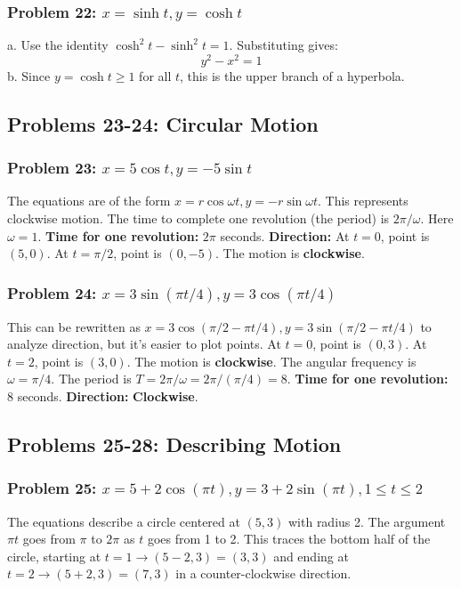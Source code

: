 \documentclass{article}
\begin{document}
\subsubsection{Problem 22: \(x=\sinh t, y=\cosh t\)}
a. Use the identity \(\cosh^2 t - \sinh^2 t = 1\). Substituting gives:
\[y^2 - x^2 = 1\]
b. Since \(y=\cosh t \ge 1\) for all \(t\), this is the upper branch of a hyperbola.

\subsection{Problems 23-24: Circular Motion}

\subsubsection{Problem 23: \(x=5\cos t, y=-5\sin t\)}
The equations are of the form \(x=r\cos\omega t, y=-r\sin\omega t\). This represents clockwise motion. The time to complete one revolution (the period) is \(2\pi/\omega\). Here \(\omega=1\).
\textbf{Time for one revolution:} \(2\pi\) seconds.
\textbf{Direction:} At \(t=0\), point is \((5,0)\). At \(t=\pi/2\), point is \((0,-5)\). The motion is \textbf{clockwise}.

\subsubsection{Problem 24: \(x=3\sin(\pi t/4), y=3\cos(\pi t/4)\)}
This can be rewritten as \(x=3\cos(\pi/2 - \pi t/4), y=3\sin(\pi/2 - \pi t/4)\) to analyze direction, but it's easier to plot points. At \(t=0\), point is \((0,3)\). At \(t=2\), point is \((3,0)\). The motion is \textbf{clockwise}. The angular frequency is \(\omega = \pi/4\). The period is \(T = 2\pi/\omega = 2\pi/(\pi/4) = 8\).
\textbf{Time for one revolution:} 8 seconds.
\textbf{Direction:} \textbf{Clockwise}.

\subsection{Problems 25-28: Describing Motion}

\subsubsection{Problem 25: \(x=5+2\cos(\pi t), y=3+2\sin(\pi t), 1 \le t \le 2\)}
The equations describe a circle centered at \((5,3)\) with radius 2. The argument \(\pi t\) goes from \(\pi\) to \(2\pi\) as \(t\) goes from 1 to 2. This traces the bottom half of the circle, starting at \(t=1 \to (5-2, 3)=(3,3)\) and ending at \(t=2 \to (5+2, 3)=(7,3)\) in a counter-clockwise direction.
\end{document}
